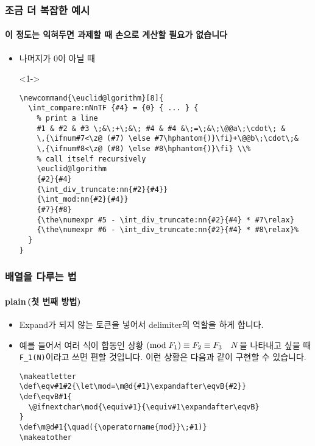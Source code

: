 \begin{frame}[fragile]
  \frametitle{조금 더 복잡한 예시}
  \framesubtitle{이 정도는 익혀두면 과제할 때 손으로 계산할 필요가 없습니다}
  \begin{itemize}
    \item<1-> 나머지가 0이 아닐 때
    \item[]<1-> \vspace{-1.5em}\begin{verbatim}
\newcommand{\euclid@lgorithm}[8]{
  \int_compare:nNnTF {#4} = {0} { ... } {
    % print a line
    #1 & #2 & #3 \;&\;+\;&\; #4 & #4 &\;=\;&\;\@@a\;\cdot\; &
    \,{\ifnum#7<\z@ (#7) \else #7\hphantom{)}\fi}+\@@b\;\cdot\;&
    \,{\ifnum#8<\z@ (#8) \else #8\hphantom{)}\fi} \\%
    % call itself recursively
    \euclid@lgorithm
    {#2}{#4}
    {\int_div_truncate:nn{#2}{#4}}
    {\int_mod:nn{#2}{#4}}
    {#7}{#8}
    {\the\numexpr #5 - \int_div_truncate:nn{#2}{#4} * #7\relax}
    {\the\numexpr #6 - \int_div_truncate:nn{#2}{#4} * #8\relax}% 
  }
}
    \end{verbatim}
  \end{itemize}
\end{frame}
\makeatletter
\def\eqv#1#2{\let\mod=\m@d{#1}\expandafter\eqvB{#2}}
\def\eqvB#1{
    \@ifnextchar\mod{\equiv#1}{\equiv#1\expandafter\eqvB}
}
\def\m@d#1{\quad({\operatorname{mod}}\;#1)}
\makeatother
{}
\begin{frame}[fragile]
  \frametitle{배열을 다루는 법}
  \framesubtitle{plain\, (첫 번째 방법)}
  \begin{itemize}
    \item Expand가 되지 않는 토큰을 넣어서 delimiter의 역할을 하게 합니다.
    \item 예를 들어서 여러 식이 합동인 상황 $\eqv{F_1}{F_2}{F_3}\mod{N}$을 나타내고 싶을 때 \texttt{\eqv{F_1}{F_2}{F_3}\mod{N}}이라고 쓰면 편할 것입니다. 이런 상황은 다음과 같이 구현할 수 있습니다.
    \vspace{-1.5em}\begin{verbatim}
\makeatletter
\def\eqv#1#2{\let\mod=\m@d{#1}\expandafter\eqvB{#2}}
\def\eqvB#1{
  \@ifnextchar\mod{\equiv#1}{\equiv#1\expandafter\eqvB}
}
\def\m@d#1{\quad({\operatorname{mod}}\;#1)}
\makeatother
    \end{verbatim}
  \end{itemize}
\end{frame}
